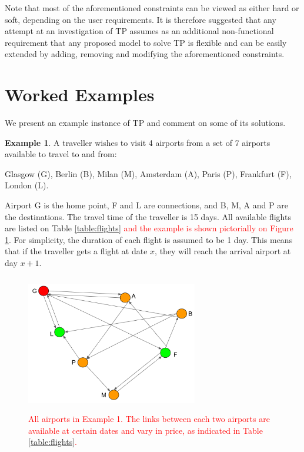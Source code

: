 \documentclass{mprop}
\theoremstyle{definition}
\newtheorem{example}{Example}
\begin{document}
Note that most of the aforementioned constraints can be viewed as either hard or soft, depending on the user requirements. It is therefore suggested that any attempt at an investigation of TP assumes as an additional non-functional requirement that any proposed model to solve TP is flexible and can be easily extended by adding, removing and modifying the aforementioned constraints.

\section{Worked Examples}
We present an example instance of TP and comment on some of its solutions.

\begin{example}
\label{example1}
A traveller wishes to visit 4 airports from a set of 7 airports available to travel to and from: 

Glasgow (G), Berlin (B), Milan (M), Amsterdam (A), Paris (P), Frankfurt (F), London (L).

Airport G is the home point, F and L are connections, and B, M, A and P are the destinations. The travel time of the traveller is 15 days. All available flights are listed on Table \ref{table:flights} \textcolor{red}{ and the example is shown pictorially on Figure \ref{fig:map}}. For simplicity, the duration of each flight is assumed to be 1 day. This means that if the traveller gets a flight at date $x$, they will reach the arrival airport at day $x+1$.

\begin{figure}
\centering
\includegraphics[height=6cm, width=7.5cm]{images/map.png}
\caption{\textcolor{red}{ All airports in Example 1. The links between each two airports are available at certain dates and vary in price, as indicated in Table \ref{table:flights}.}}
\label{fig:map}
\end{figure}


\end{example}
\end{document}
